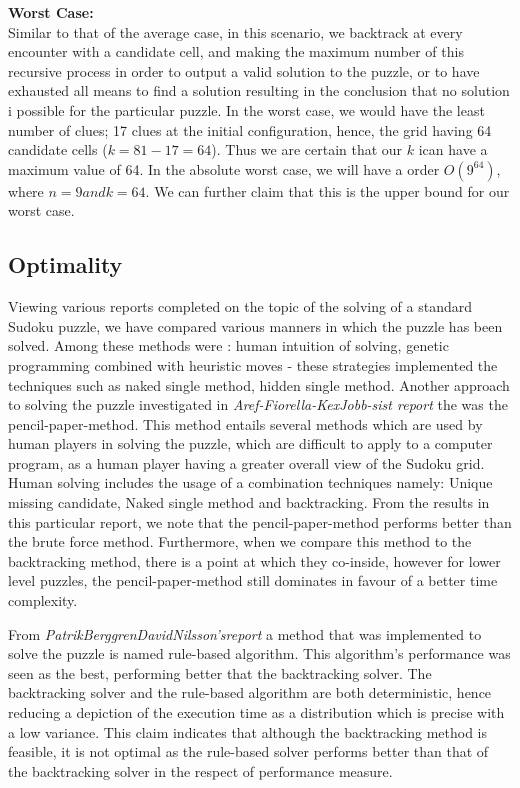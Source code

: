 \documentclass[12pt]{article}
\begin{document}
\begin{flushleft}
\textbf{Worst Case:}\\
Similar to that of the average case, in this scenario, we backtrack at every encounter with a candidate cell, and making the maximum number of this recursive process in order to output a valid solution to the puzzle, or to have exhausted all means to find a solution resulting in the conclusion that no solution i possible for the particular puzzle. In the worst case, we would have the least number of clues; 17 clues at the initial configuration, hence, the grid having 64 candidate cells ($k = 81-17 = 64$). Thus we are certain that our $k$ ican have a maximum value of 64. In the absolute worst case, we will have a order $O(9^64)$, where $n = 9 and k = 64$. We can further claim that this is the upper bound for our worst case.  
\end{flushleft}
\subsection{Optimality}
\begin{flushleft}
Viewing various reports completed on the topic of the solving of a standard Sudoku puzzle, we have compared various manners in which the puzzle has been solved. 
Among these methods were : human intuition of solving, genetic programming combined with heuristic moves - these strategies implemented the techniques such as naked single method, hidden single method. 
Another approach to solving the puzzle investigated in \textsl{Aref-Fiorella-KexJobb-sist report} the  was the pencil-paper-method. This method entails several methods which are used by human players in solving the puzzle, which are difficult to apply to a computer program, as a human player having a greater overall view of the Sudoku grid. Human solving includes the usage of a combination techniques namely: Unique missing candidate, Naked single method and backtracking. From the results in this particular report, we note that the pencil-paper-method performs better than the brute force method. Furthermore, when we compare this method to the backtracking method, there is a point at which they co-inside, however for lower level puzzles, the pencil-paper-method still dominates in favour of a better time complexity. 
\end{flushleft}

\begin{flushleft}
From \textit{PatrikBerggrenDavidNilsson'sreport} a method that was implemented to solve the puzzle is named rule-based algorithm. This algorithm's performance was seen as the best, performing better that the backtracking solver. The backtracking solver and the rule-based algorithm are both deterministic, hence reducing a depiction of the execution time as a distribution which is precise with a low variance. This claim indicates that although the backtracking method is feasible, it is not optimal as the rule-based solver performs better than that of the backtracking solver in the respect of performance measure. 
\end{flushleft}
\end{document}
